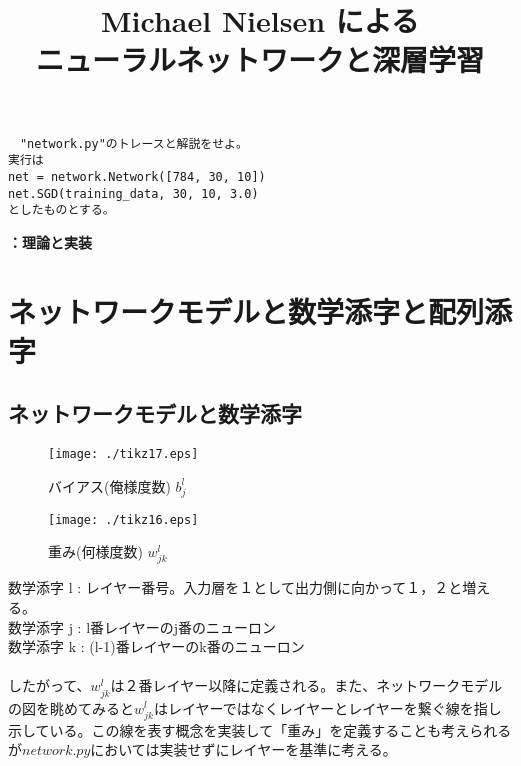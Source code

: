 \documentclass[11pt,a4j,fleqn]{jarticle}
\newcounter{apart}
\begin{document}
\title{
	\textbf{\Large  Michael Nielsen による\\
	\bigskip
	ニューラルネットワークと深層学習}\\
	\bigskip
}
\maketitle
\begin{verbatim}
　"network.py"のトレースと解説をせよ。
実行は
net = network.Network([784, 30, 10])
net.SGD(training_data, 30, 10, 3.0)
としたものとする。
\end{verbatim}
\bigskip
\bigskip

\renewcommand{\theapart}{}
\setcounter{apart}{1}

\textbf{\Large \theapart ：理論と実装}

\section{ネットワークモデルと数学添字と配列添字}
\subsection{ネットワークモデルと数学添字}
\begin{figure}[htbp]
 \begin{minipage}{0.5\hsize}
  \begin{center}
   \texttt{[image: ./tikz17.eps]}
  \end{center}
  \caption{バイアス(俺様度数) $b^l_{j}$}
 \end{minipage}
 \begin{minipage}{0.5\hsize}
  \begin{center}
   \texttt{[image: ./tikz16.eps]}
  \end{center}
  \caption{重み(何様度数) $w^l_{jk}$}
 \end{minipage}
\end{figure}
 \hspace{2mm} 数学添字 l : レイヤー番号。入力層を１として出力側に向かって１，２と増える。 \\
 \hspace{5mm} 数学添字 j : l番レイヤーのj番のニューロン \\
 \hspace{5mm} 数学添字 k : (l-1)番レイヤーのk番のニューロン \\
 \\
 したがって、$w^l_{jk}$は２番レイヤー以降に定義される。また、ネットワークモデルの図を眺めてみると$w^l_{jk}$はレイヤーではなくレイヤーとレイヤーを繋ぐ線を指し示している。この線を表す概念を実装して「重み」を定義することも考えられるが$network.py$においては実装せずにレイヤーを基準に考える。\\
\end{document}
